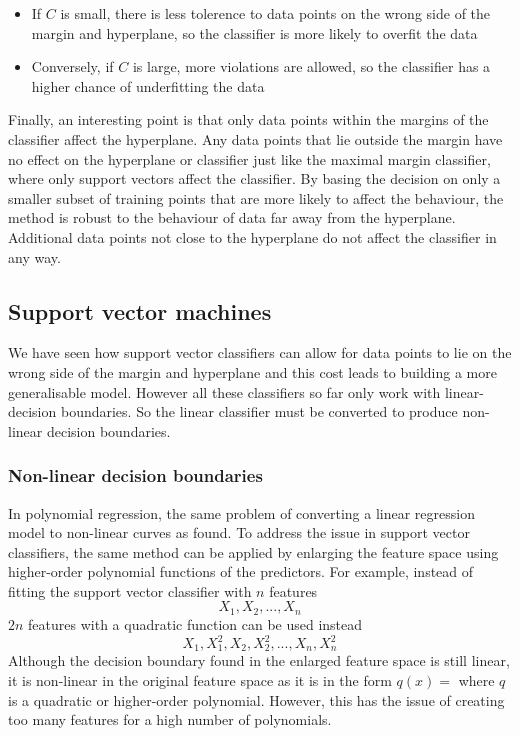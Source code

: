 \documentclass[CS5104-Notes.tex]{subfiles}
\begin{document}
\begin{itemize}
\item If $C$ is small, there is less tolerence to data points on the wrong side of the margin and hyperplane, so the classifier is more likely to overfit the data
\item Conversely, if $C$ is large, more violations are allowed, so the classifier has a higher chance of underfitting the data
\end{itemize}
Finally, an interesting point is that only data points within the margins of the classifier affect the hyperplane. Any data points that lie outside the margin have no effect on the hyperplane or classifier just like the maximal margin classifier, where only support vectors affect the classifier. By basing the decision on only a smaller subset of training points that are more likely to affect the behaviour, the method is robust to the behaviour of data far away from the hyperplane. Additional data points not close to the hyperplane do not affect the classifier in any way.

\subsection{Support vector machines}
We have seen how support vector classifiers can allow for data points to lie on the wrong side of the margin and hyperplane and this cost leads to building a more generalisable model. However all these classifiers so far only work with linear-decision boundaries. So the linear classifier must be converted to produce non-linear decision boundaries.

\subsubsection{Non-linear decision boundaries}
In polynomial regression, the same problem of converting a linear regression model to non-linear curves as found. To address the issue in support vector classifiers, the same method can be applied by enlarging the feature space using higher-order polynomial functions of the predictors. For example, instead of fitting the support vector classifier with $n$ features
\begin{equation*}
X_{1}, X_{2}, ..., X_{n}
\end{equation*}
$2n$ features with a quadratic function can be used instead
\begin{equation*}
X_{1}, X_{1}^{2}, X_{2}, X_{2}^{2}, ..., X_{n}, X_{n}^{2}
\end{equation*}
Although the decision boundary found in the enlarged feature space is still linear, it is non-linear in the original feature space as it is in the form $q(x) = $ where $q$ is a quadratic or higher-order polynomial. However, this has the issue of creating too many features for a high number of polynomials.
\end{document}
